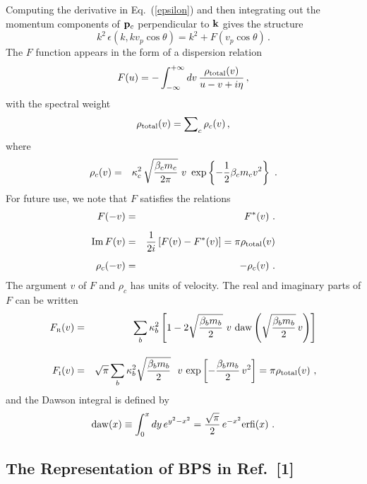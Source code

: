 \documentclass[preprint,12pt,eqsecnum,nofootinbib,amsmath,amssymb]{revtex4}
\newcommand{\smI}{{\rm\scriptscriptstyle I}}
\newcommand{\smR}{{\rm\scriptscriptstyle R}}
\begin{document}
Computing the derivative in Eq.~(\ref{epsilon}) and then 
integrating out the momentum components of ${\bf p}_c$ 
perpendicular to ${\bf k}$ gives the structure
\begin{equation}
  k^2 \, \epsilon( k , k v_p \cos\theta ) =
  k^2 + F(v_p \cos\theta)  \,.
\label{struct}
\end{equation}
The $F$ function appears in the form of a 
dispersion relation
\begin{equation}
  F(u)  =  - \int_{-\infty}^{+\infty} dv \, 
{ \rho_{\rm total}(v) \over u
  - v + i \eta } \,,
\label{disp}
\end{equation}
with the spectral weight
\begin{equation}
  \rho_{\rm total}(v)  = {\sum}_c \, 
	\rho_c(v) \,,
\label{efrelb}
\end{equation}
where
\begin{eqnarray}
\label{spectral}
  \rho_c(v) &=& 
  \kappa^2_c \,\sqrt{ \beta_c m_c \over 2\pi } ~v ~
  \exp\left\{
  -{1 \over 2} \beta_c m_c v^2 \right\} \ .
\end{eqnarray}
For future use, we note that $F$ satisfies the relations
\begin{eqnarray}
\label{fmfstar}
  F(-v) &=& F^*(v) \ .
\\[5pt]
\label{ImF}
  {\rm Im} \, F(v) &=& {1 \over 2i} 
  \left[ F(v) - F^*(v) \right] = 
  \pi  \rho_{\rm total}(v) 
\\[5pt]
\label{rhoodd}
  \rho_c(-v) &=& - \rho_c(v) \ .
\end{eqnarray}
The argument $v$ of $F$ and $\rho_c$ has units of velocity.
The real and imaginary parts of $F$ can be written
\begin{eqnarray}
\label{Fru}
  F_\smR(v)
  &=& 
  \sum_b \kappa_b^2 
  \left[1 - 2 \sqrt{\frac{\beta_b m_b}{2}} ~v~
  {\rm daw}\left(\sqrt{\frac{\beta_b m_b}{2}}\,v 
  \right) \right]
\\[10pt]
\label{Fiu}
  F_\smI(v)
  &=&
  \sqrt{\pi} \sum_b \kappa_b^2 
  \sqrt{\frac{\beta_b m_b}{2}}~~
  v\, \exp\left[-\frac{\beta_b m_b}
  {2}\, v^2\right] = \pi  \rho_{\rm total}(v)  \ ,
\end{eqnarray}
and the Dawson integral is defined by
\begin{eqnarray}
  {\rm daw}(x) \equiv \int_0^x dy\, 
  e^{y^2 - x^2} = \frac{\sqrt{\pi}}{2}\, e^{-x^2}
  {\rm erfi}(x) \ .
\end{eqnarray}


\subsection{The Representation of BPS in Ref.~[1]}
\end{document}
